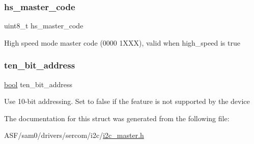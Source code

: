 \subsubsection{\texorpdfstring{hs\_master\_code}{hs\_master\_code}}
{\footnotesize\ttfamily uint8\+\_\+t hs\+\_\+master\+\_\+code}

High speed mode master code (0000 1X\+XX), valid when high\+\_\+speed is true \mbox{\label{structi2c__master__packet_a3a307f1d645980c963f88064226ac3b5}} 
\subsubsection{\texorpdfstring{ten\_bit\_address}{ten\_bit\_address}}
{\footnotesize\ttfamily \mbox{\hyperlink{group__group__sam0__utils_ga97a80ca1602ebf2303258971a2c938e2}{bool}} ten\+\_\+bit\+\_\+address}

Use 10-\/bit addressing. Set to false if the feature is not supported by the device 

The documentation for this struct was generated from the following file\+:\begin{DoxyCompactItemize}
\item 
A\+S\+F/sam0/drivers/sercom/i2c/\mbox{\hyperlink{i2c__master_8h}{i2c\+\_\+master.\+h}}\end{DoxyCompactItemize}
